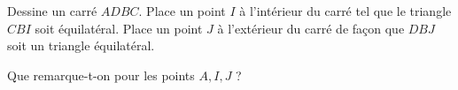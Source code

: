 Dessine un carré $ADBC$. Place un point $I$ à l'intérieur du carré
 tel que le triangle $CBI$ soit équilatéral. Place un point $J$ à
 l'extérieur du carré de façon que $DBJ$ soit un triangle équilatéral.
\par Que remarque-t-on pour les points $A,I,J$ ?